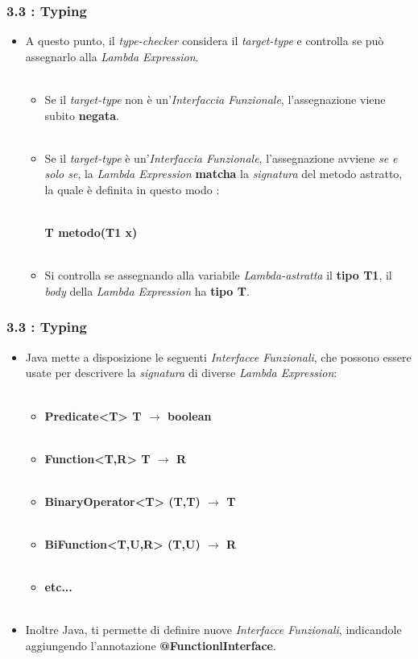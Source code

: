 \documentclass{beamer}
\begin{document}
\begin{frame}
	\frametitle{\textbf{3.3 : Typing}}
	\begin{itemize}
		\item
			A questo punto, il \textit{type-checker} considera il \textit{target-type} e controlla se può assegnarlo alla \textit{Lambda Expression}.\\\
			\begin{itemize}
				\item
					Se il \textit{target-type} non è un'\textit{Interfaccia Funzionale}, l'assegnazione viene subito \textbf{negata}.\\\
				\item
					Se il \textit{target-type} è un'\textit{Interfaccia Funzionale}, l'assegnazione avviene \textit{se e solo se}, la \textit{Lambda Expression} \textbf{matcha} la \textit{signatura} del metodo astratto, la quale è definita in questo modo :\\\
					\begin{center}
						\textbf{T metodo(T1 x)}\\\
					\end{center}
				\item
					Si controlla se assegnando alla variabile \textit{Lambda-astratta} il \textbf{tipo T1}, il \textit{body} della \textit{Lambda Expression} ha \textbf{tipo T}.
			\end{itemize}
	\end{itemize}
\end{frame}


\begin{frame}
	\frametitle{\textbf{3.3 : Typing}}
	\begin{itemize}
		\item
			Java mette a disposizione le seguenti \textit{Interfacce Funzionali}, che possono essere usate per descrivere la \textit{signatura} di diverse \textit{Lambda Expression}:\\\
			\begin{itemize}
				\item
					\textbf{Predicate<T> \quad T $\rightarrow$ boolean}\\\
				\item
					\textbf{Function<T,R> \quad T $\rightarrow$ R}\\\
				\item
					\textbf{BinaryOperator<T> \quad (T,T) $\rightarrow$ T}\\\
				\item
					\textbf{BiFunction<T,U,R> \quad (T,U) $\rightarrow$ R}\\\
				\item
					\textbf{etc...}\\\
			\end{itemize}
		\item
			Inoltre Java, ti permette di definire nuove \textit{Interfacce Funzionali}, indicandole aggiungendo l'annotazione \textbf{@FunctionlInterface}.
	\end{itemize}
\end{frame}
\end{document}
